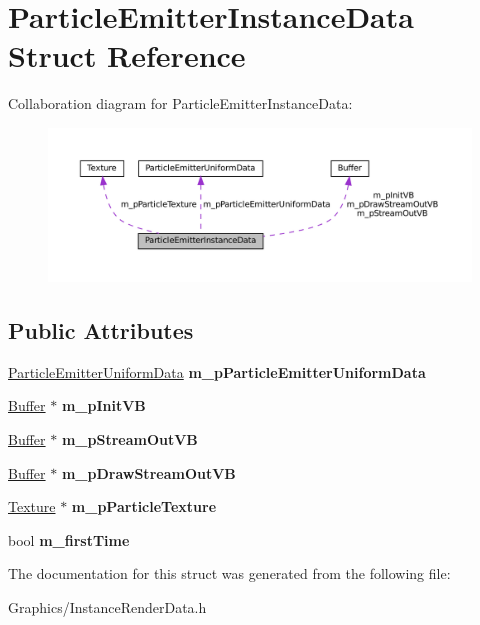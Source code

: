 \hypertarget{structParticleEmitterInstanceData}{}\section{Particle\+Emitter\+Instance\+Data Struct Reference}
\label{structParticleEmitterInstanceData}


Collaboration diagram for Particle\+Emitter\+Instance\+Data\+:
\nopagebreak
\begin{figure}[H]
\begin{center}
\leavevmode
\includegraphics[width=350pt]{structParticleEmitterInstanceData__coll__graph}
\end{center}
\end{figure}
\subsection*{Public Attributes}
\begin{DoxyCompactItemize}
\item 
\mbox{\label{structParticleEmitterInstanceData_a2c577a1a5d79f35f1f63f3c049c08276}} 
\hyperlink{structParticleEmitterUniformData}{Particle\+Emitter\+Uniform\+Data} {\bfseries m\+\_\+p\+Particle\+Emitter\+Uniform\+Data}
\item 
\mbox{\label{structParticleEmitterInstanceData_a27db7c8d0ec7a7bd854aa029e78c04a6}} 
\hyperlink{classBuffer}{Buffer} $\ast$ {\bfseries m\+\_\+p\+Init\+VB}
\item 
\mbox{\label{structParticleEmitterInstanceData_a01e9ae7bfec9166441d91ade91ec8bb7}} 
\hyperlink{classBuffer}{Buffer} $\ast$ {\bfseries m\+\_\+p\+Stream\+Out\+VB}
\item 
\mbox{\label{structParticleEmitterInstanceData_ad504b778677ed6a7b0f15debd706324b}} 
\hyperlink{classBuffer}{Buffer} $\ast$ {\bfseries m\+\_\+p\+Draw\+Stream\+Out\+VB}
\item 
\mbox{\label{structParticleEmitterInstanceData_ac6f11a17562759c6a609c6ed76788958}} 
\hyperlink{classTexture}{Texture} $\ast$ {\bfseries m\+\_\+p\+Particle\+Texture}
\item 
\mbox{\label{structParticleEmitterInstanceData_a5f8696d0c248e3ca51b705ed50240149}} 
bool {\bfseries m\+\_\+first\+Time}
\end{DoxyCompactItemize}


The documentation for this struct was generated from the following file\+:\begin{DoxyCompactItemize}
\item 
Graphics/Instance\+Render\+Data.\+h\end{DoxyCompactItemize}
